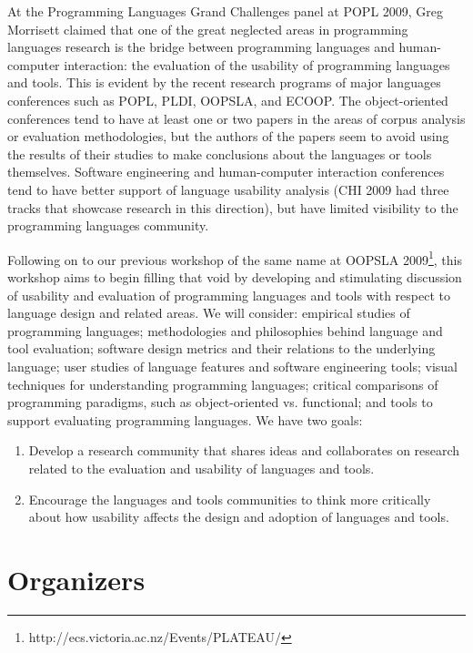 \documentclass[authorpermission]{sigplanconf}
\begin{document}
At the Programming Languages Grand Challenges panel at POPL 2009, Greg
Morrisett claimed that one of the great neglected areas in programming
languages research is the bridge between programming languages and
human-computer interaction: the evaluation of the usability of
programming languages and tools. This is evident by the recent
research programs of major languages conferences such as POPL, PLDI,
OOPSLA, and ECOOP. The object-oriented conferences tend to have at
least one or two papers in the areas of corpus analysis or evaluation
methodologies, but the authors of the papers seem to avoid using the
results of their studies to make conclusions about the languages or
tools themselves. Software engineering and human-computer interaction
conferences tend to have better support of language usability analysis
(CHI 2009 had three tracks that showcase research in this direction),
but have limited visibility to the programming languages community.

Following on to our previous workshop of the same name at OOPSLA 
2009\footnote{http://ecs.victoria.ac.nz/Events/PLATEAU/},
this workshop aims to begin filling that void by
developing and stimulating discussion of usability and evaluation of
programming languages and tools with respect to language design and
related areas. We will consider: empirical studies of programming
languages; methodologies and philosophies behind language and tool
evaluation; software design metrics and their relations to the
underlying language; user studies of language features and software
engineering tools; visual techniques for understanding programming
languages; critical comparisons of programming paradigms, such as
object-oriented vs. functional; and tools to support evaluating
programming languages. We have two goals:

\begin{enumerate}
  \item 
Develop a research community that shares ideas and collaborates on 
research related to the evaluation and usability of languages and tools.
\item
Encourage the languages and tools communities to think more critically
about how usability affects the  design and
adoption of languages and tools.
\end{enumerate}


\section{Organizers}
\end{document}
